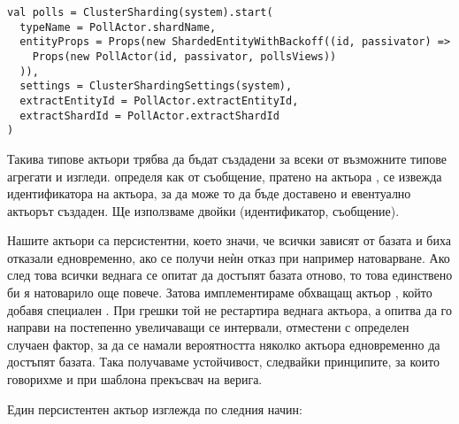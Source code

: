 \begin{lstlisting}
val polls = ClusterSharding(system).start(
  typeName = PollActor.shardName,
  entityProps = Props(new ShardedEntityWithBackoff((id, passivator) =>
    Props(new PollActor(id, passivator, pollsViews))
  )),
  settings = ClusterShardingSettings(system),
  extractEntityId = PollActor.extractEntityId,
  extractShardId = PollActor.extractShardId
)
\end{lstlisting}

Такива типове актьори трябва да бъдат създадени за всеки от възможните типове агрегати и изгледи.  определя как от съобщение, пратено на актьора , се извежда идентификатора на актьора, за да може то да бъде доставено и евентуално актьорът създаден. Ще използваме двойки (идентификатор, съобщение).

Нашите актьори са персистентни, което значи, че всички зависят от базата и биха отказали едновременно, ако се получи неѝн отказ при например натоварване. Ако след това всички веднага се опитат да достъпят базата отново, то това единствено би я натоварило още повече. Затова имплементираме обхващащ актьор , който добавя специален . При грешки той не рестартира веднага актьора, а опитва да го направи на постепенно увеличаващи се интервали, отместени с определен случаен фактор, за да се намали вероятността няколко актьора едновременно да достъпят базата. Така получаваме устойчивост, следвайки принципите, за които говорихме и при шаблона прекъсвач на верига.

Един персистентен актьор изглежда по следния начин:

